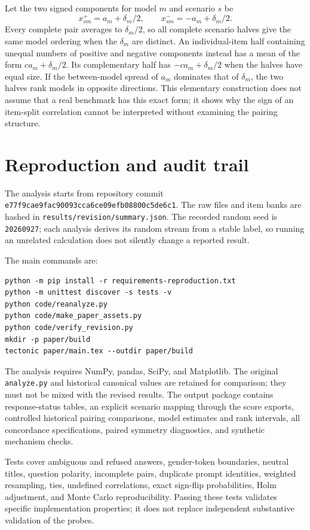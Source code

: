 \documentclass[11pt]{article}
\begin{document}
Let the two signed components for model $m$ and scenario $s$ be
\begin{equation}
 x_{sm}^{+}=a_m+\delta_m/2,\qquad
 x_{sm}^{-}=-a_m+\delta_m/2.
\end{equation}
Every complete pair averages to $\delta_m/2$, so all complete scenario halves
give the same model ordering when the $\delta_m$ are distinct. An individual-item
half containing unequal numbers of positive and negative components instead
has a mean of the form $c a_m+\delta_m/2$. Its complementary half has
$-c a_m+\delta_m/2$ when the halves have equal size. If the between-model spread
of $a_m$ dominates that of $\delta_m$, the two halves rank models in opposite
directions. This elementary construction does not assume that a real benchmark
has this exact form; it shows why the sign of an item-split correlation cannot
be interpreted without examining the pairing structure.

\section{Reproduction and audit trail}

The analysis starts from repository commit
\texttt{e77f9cae9fac90093cca6ce09efb08800c5de6c1}. The raw files and item banks
are hashed in \texttt{results/revision/summary.json}. The recorded random seed is
\texttt{20260927}; each analysis derives its random stream from a stable label,
so running an unrelated calculation does not silently change a reported result.

The main commands are:\par\noindent
\begin{minipage}{\linewidth}
\begin{verbatim}
python -m pip install -r requirements-reproduction.txt
python -m unittest discover -s tests -v
python code/reanalyze.py
python code/make_paper_assets.py
python code/verify_revision.py
mkdir -p paper/build
tectonic paper/main.tex --outdir paper/build
\end{verbatim}
\end{minipage}
\par
The analysis requires NumPy, pandas, SciPy, and Matplotlib. The original
\texttt{analyze.py} and historical canonical values are retained for comparison;
they must not be mixed with the revised results. The output package contains
response-status tables, an explicit scenario mapping through the score exports,
controlled historical pairing comparisons, model estimates and rank intervals,
all concordance specifications, paired symmetry diagnostics, and synthetic
mechanism checks.

Tests cover ambiguous and refused answers, gender-token boundaries, neutral
titles, question polarity, incomplete pairs, duplicate prompt identities,
weighted resampling, ties, undefined correlations, exact sign-flip probabilities,
Holm adjustment, and Monte Carlo reproducibility. Passing these tests validates
specific implementation properties; it does not replace independent substantive
validation of the probes.
\end{document}
